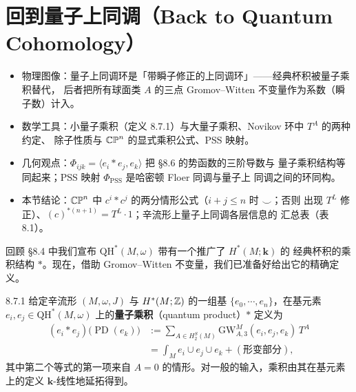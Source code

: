 \section{回到量子上同调（Back to Quantum Cohomology）}

\begin{keytakeaways}
\begin{itemize}
  \item 物理图像：量子上同调环是「带瞬子修正的上同调环」——经典杯积被量子乘积替代，
        后者把所有球面类 $A$ 的三点 Gromov--Witten 不变量作为系数（瞬子数）计入。
  \item 数学工具：小量子乘积（定义 8.7.1）与大量子乘积、Novikov 环中 $T^A$ 的两种约定、
        除子性质与 $\mathbb{CP}^n$ 的显式乘积公式、PSS 映射。
  \item 几何观点：$\Phi_{ijk}=\langle e_i*e_j,e_k\rangle$ 把 §8.6 的势函数的三阶导数与
        量子乘积结构等同起来；PSS 映射 $\Phi_{\mathrm{PSS}}$ 是哈密顿 Floer 同调与量子上
        同调之间的环同构。
  \item 本节结论：$\mathbb{CP}^n$ 中 $c^i*c^j$ 的两分情形公式（$i+j\le n$ 时 $\smile$；否则
        出现 $T^L$ 修正）、$(c)^{*(n+1)}=T^L\cdot1$；辛流形上量子上同调各层信息的
        汇总表（表 8.1）。
\end{itemize}
\end{keytakeaways}

回顾 §8.4 中我们宣布 $\mathrm{QH}^*(M,\omega)$ 带有一个推广了 $H^*(M;\mathbf{k})$ 的
经典杯积的乘积结构 $*$。现在，借助 Gromov--Witten 不变量，我们已准备好给出它的精确定义。

\begin{wdefn}{8.7.1}
给定辛流形 $(M,\omega,J)$ 与 $H^*(M;\mathbb{Z})$ 的一组基 $\{e_0,\cdots,e_n\}$，在基元素
$e_i,e_j\in\mathrm{QH}^*(M,\omega)$ 上的\textbf{量子乘积}（quantum product）$*$ 定义为
\begin{equation}
  \begin{aligned}
    (e_i*e_j)\big(\operatorname{PD}(e_k)\big)
    &:=\sum_{A\in H_2^S(M)}\mathrm{GW}^M_{A,3}(e_i,e_j,e_k)\,T^A\\
    &=\int_Me_i\cup e_j\cup e_k+(\text{形变部分}),
  \end{aligned}
  \tag{8.52}
\end{equation}
其中第二个等式的第一项来自 $A=0$ 的情形。对一般的输入，乘积由其在基元素上的定义
$\mathbf{k}$-线性地延拓得到。
\end{wdefn}

